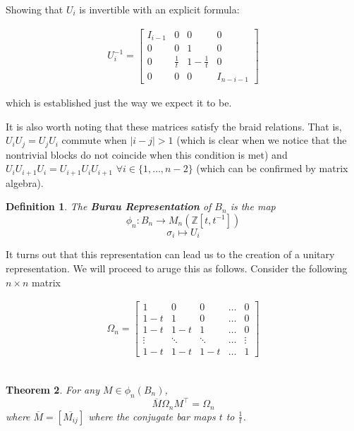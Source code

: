 \documentclass[10pt]{ucthesis}
\newcommand{\Z}{\mathbb{Z}}
\newtheorem{definition}{Definition}[chapter]
\newtheorem{theorem}[definition]{Theorem}
\begin{document}
Showing that $U_i$ is invertible with an explicit formula:

\begin{equation}
\begin{aligned}
	U_i^{-1}=\begin{bmatrix}
			I_{i-1}& 0 & 0 & 0 \\
			0 & 0 & 1 & 0\\
			0 & \frac{1}{t} & 1-\frac{1}{t} & 0\\
			0 & 0 & 0 & I_{n-i-1}
		\end{bmatrix}
\end{aligned}
\end{equation}

which is established just the way we expect it to be.

It is also worth noting that these matrices satisfy the braid relations. That is, $U_iU_j=U_jU_i$ commute when $|i-j|>1$ (which is clear when we notice that the nontrivial blocks do not coincide when this condition is met) and $U_iU_{i+1}U_i=U_{i+1}U_iU_{i+1}$ $\forall i\in\{1,\hdots,n-2\}$ (which can be confirmed by matrix algebra).

\begin{definition}
	The \textbf{Burau Representation} of $B_n$ is the map 
$$\phi_n:B_n\rightarrow M_n(\Z[t,t^{-1}])$$
$$\sigma_i \mapsto U_i$$
\end{definition}

It turns out that this representation can lead us to the creation of a unitary representation. We will proceed to aruge this as follows. Consider the following $n\times n$ matrix

\begin{equation}
\begin{aligned}
	\Omega_n = \begin{bmatrix}
						1 & 0 & 0 &\hdots & 0 \\
						1-t & 1 & 0 & \hdots & 0 \\
						1-t & 1-t & 1 & \hdots & 0 \\
						\vdots&\ddots&\ddots&\hdots&\vdots\\
						1-t & 1-t & 1-t & \hdots & 1
					\end{bmatrix}
\end{aligned}
\end{equation}\\

\begin{theorem}
	For any $M\in \phi_n(B_n)$, 
$$\overline{M}\Omega_nM^\intercal = \Omega_n$$
where $\overline{M}=[\overline{M_{ij}}]$ where the conjugate bar maps $t$ to $\frac{1}{t}$.
\end{theorem}
\end{document}
